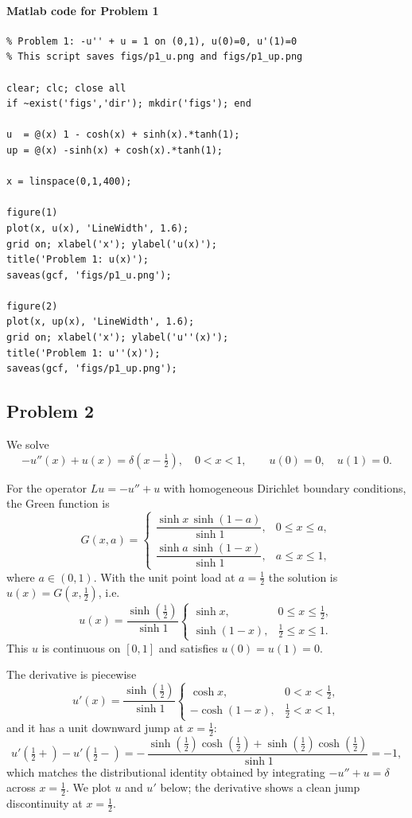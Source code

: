 \documentclass[12pt, a4paper]{article}
\begin{document}
\paragraph{Matlab code for Problem 1}
\begin{verbatim}
% Problem 1: -u'' + u = 1 on (0,1), u(0)=0, u'(1)=0
% This script saves figs/p1_u.png and figs/p1_up.png

clear; clc; close all
if ~exist('figs','dir'); mkdir('figs'); end

u  = @(x) 1 - cosh(x) + sinh(x).*tanh(1);
up = @(x) -sinh(x) + cosh(x).*tanh(1);

x = linspace(0,1,400);

figure(1)
plot(x, u(x), 'LineWidth', 1.6);
grid on; xlabel('x'); ylabel('u(x)');
title('Problem 1: u(x)');
saveas(gcf, 'figs/p1_u.png');

figure(2)
plot(x, up(x), 'LineWidth', 1.6);
grid on; xlabel('x'); ylabel('u''(x)');
title('Problem 1: u''(x)');
saveas(gcf, 'figs/p1_up.png');
\end{verbatim}

\newpage
\subsection*{Problem 2}

We solve
\[
-u''(x)+u(x)=\delta\!\left(x-\tfrac{1}{2}\right), \quad 0<x<1,
\qquad u(0)=0,\quad u(1)=0 .
\]

For the operator \(L u=-u''+u\) with homogeneous Dirichlet boundary conditions, the Green function is
\[
G(x,a)=
\begin{cases}
\dfrac{\sinh x\,\sinh(1-a)}{\sinh 1}, & 0\le x\le a,\\[6pt]
\dfrac{\sinh a\,\sinh(1-x)}{\sinh 1}, & a\le x\le 1,
\end{cases}
\]
where \(a\in(0,1)\). With the unit point load at \(a=\tfrac12\) the solution is \(u(x)=G(x,\tfrac12)\), i.e.
\[
\boxed{
u(x)=\frac{\sinh(\tfrac12)}{\sinh 1}
\begin{cases}
\sinh x, & 0\le x\le \tfrac12,\\[4pt]
\sinh(1-x), & \tfrac12\le x\le 1 .
\end{cases}}
\]
This \(u\) is continuous on \([0,1]\) and satisfies \(u(0)=u(1)=0\).

The derivative is piecewise
\[
u'(x)=\frac{\sinh(\tfrac12)}{\sinh 1}
\begin{cases}
\cosh x, & 0<x<\tfrac12,\\[4pt]
-\cosh(1-x), & \tfrac12<x<1 ,
\end{cases}
\]
and it has a unit downward jump at \(x=\tfrac12\):
\[
u'\!\left(\tfrac12+\right)-u'\!\left(\tfrac12-\right)
=-\,\frac{\sinh(\tfrac12)\cosh(\tfrac12)+\sinh(\tfrac12)\cosh(\tfrac12)}{\sinh 1}
=-1,
\]
which matches the distributional identity obtained by integrating
\(-u''+u=\delta\) across \(x=\tfrac12\).
We plot \(u\) and \(u'\) below; the derivative shows a clean jump discontinuity at \(x=\tfrac12\).
\end{document}
